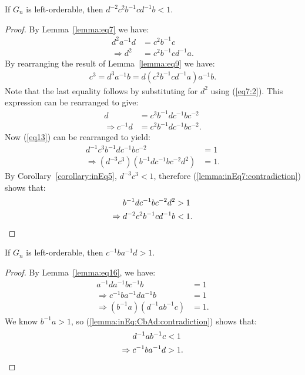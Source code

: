 \begin{lemma} If $G_n$ is left-orderable, then $d^{-2}c^{2}b^{-1}cd^{-1}b<1$.
\label{lemma:inEq7}
\end{lemma}
\begin{proof} By  Lemma~\ref{lemma:eq7} we have:
\begin{align}
d^{2}a^{-1}d&=c^{2}b^{-1}c\nonumber{}\\
\Rightarrow{}d^{2}&=c^{2}b^{-1}cd^{-1}a.\label{eq7:2}
\end{align}
By rearranging the result of Lemma~\ref{lemma:eq9} we have:
\begin{align*}
c^{3}=d^{3}a^{-1}b=d(c^{2}b^{-1}cd^{-1}a)a^{-1}b.
\end{align*}
Note that the last equality follows by substituting for $d^{2}$ using (\ref{eq7:2}). This expression can be rearranged to give:
\begin{align}
d&=c^{3}b^{-1}dc^{-1}bc^{-2}\nonumber{}\\
\Rightarrow{}c^{-1}d&=c^2b^{-1}dc^{-1}bc^{-2}.\label{eq13}
\end{align}
Now (\ref{eq13}) can be rearranged to yield:
\begin{align}
d^{-1}c^3b^{-1}dc^{-1}bc^{-2}&=1\nonumber{}\\
\Rightarrow{}(d^{-3}c^3)(b^{-1}dc^{-1}bc^{-2}d^{2})&=1.\label{lemma:inEq7:contradiction}
\end{align}
By Corollary~\ref{corollary:inEq5}, $d^{-3}c^3<1$, therefore (\ref{lemma:inEq7:contradiction}) shows that:
\begin{align*}
b^{-1}dc^{-1}bc^{-2}d^{2}&>1\\
\Rightarrow{}d^{-2}c^{2}b^{-1}cd^{-1}b&<1.\qedhere
\end{align*}
\end{proof}

\begin{lemma} If $G_n$ is left-orderable, then $c^{-1}ba^{-1}d>1$.
\label{lemma:inEq:CbAd}
\end{lemma}
\begin{proof} By Lemma~\ref{lemma:eq16}, we have:
\begin{align}
a^{-1}da^{-1}bc^{-1}b&= 1\nonumber{}\\
\Rightarrow{}c^{-1}ba^{-1}da^{-1}b &=1\nonumber{}\\
\Rightarrow{}(b^{-1}a)(d^{-1}ab^{-1}c) &= 1.\label{lemma:inEq:CbAd:contradiction}
\end{align}
We know $b^{-1}a>1$, so (\ref{lemma:inEq:CbAd:contradiction}) shows that:
\begin{align*}
d^{-1}ab^{-1}c&<1\\
\Rightarrow{}c^{-1}ba^{-1}d&>1.\qedhere
\end{align*}
\end{proof}

